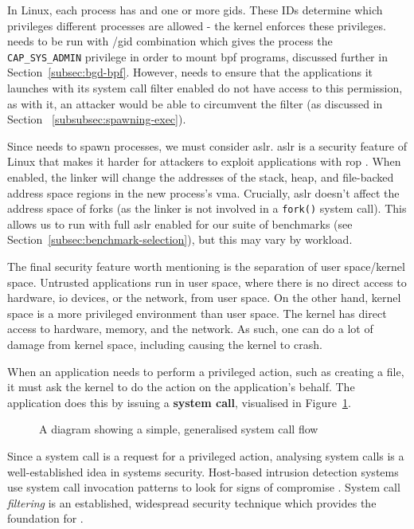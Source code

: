 In Linux, each process has  and one or more \acp{gid}.
These IDs determine which privileges different processes are allowed - the kernel enforces these
privileges. \af needs to be run with
/\ac{gid} combination which gives the process the
\texttt{CAP\_SYS\_ADMIN} privilege in order to mount \ac{bpf} programs,
discussed further in Section~\ref{subsec:bgd-bpf}. However, \af needs to ensure
that the applications it launches with its system call filter enabled do not
have access to this permission, as with it, an attacker would be able to
circumvent the filter (as discussed in Section ~\ref{subsubsec:spawning-exec}).

Since \af needs to spawn processes, we must consider \ac{aslr}. \ac{aslr} is a security feature of Linux that makes it harder for
attackers to exploit applications with \ac{rop} \cite{ASLR_GUARD}. When
enabled, the linker will change the addresses of the stack, heap, and file-backed address space regions in the new process's \ac{vma}. Crucially, \ac{aslr}
doesn't affect the address space of forks (as the linker is not involved in
a \texttt{fork()} system call). This allows us to run \af with full \ac{aslr}
enabled for our suite of benchmarks (see 
Section~\ref{subsec:benchmark-selection}), but this may vary by workload.  

The final security feature worth mentioning is the separation of user
space/kernel space. Untrusted applications run in user space, where there is no
direct access to hardware, \ac{io} devices, or the 
network, from user space. On the other hand, kernel space is a more privileged 
environment than user space. The kernel has direct access to hardware, memory, and the
network. As such, one can do a lot of damage from kernel space, including causing
the kernel to crash.

When an application needs to perform a privileged action, such as creating a
file, it must ask the kernel to do the action on the application's behalf. The
application does this by issuing a \textbf{system call}, visualised in
Figure~\ref{fig:syscall-flow}.

\begin{figure}[h]
\centering
{}
\caption{A diagram showing a simple, generalised system call
flow}\label{fig:syscall-flow}
\end{figure}

Since a system call is a request for a privileged action, analysing system calls
is a well-established idea in systems security. Host-based intrusion detection
systems use system call invocation patterns to look for signs of compromise 
\cite{10.1145/3214304}. System call \textit{filtering} is an established, 
widespread security technique which provides the foundation for \af.

